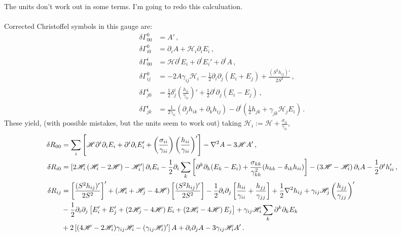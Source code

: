 \documentclass{article}
\newcommand*\scr[1]{\mathscr{#1}}
\newcommand*\p[1]{\left(#1\right)}
\newcommand*\ps[1]{\left[#1\right]}
\newcommand*\f[2]{\frac{#1}{#2}}
\begin{document}
The units don't work out in some terms. I'm going to redo this calculuation.
\\\\
Corrected Christoffel symbols in this gauge are:
\begin{align}
\delta\Gamma^0_{00}&=A'\,,\\
\delta\Gamma^0_{i0}&=\partial_i A+\scr H_i\partial_i E_i\,,\\
\delta\Gamma^i_{00}&=\scr H\partial^i E_i+\partial^i E_i'+\partial^i A\,,\\
\delta\Gamma^0_{ij}&=-2A\gamma_{ij}\scr H_i-\f12\partial_i\partial_j(E_i+E_j)+\f{(S^2 h_{ij})'}{2S^2}\,,\\
\delta\Gamma^i_{j0}&=\f12\delta^i_j\p{\f{h_{ii}}{\gamma_{ii}}}'+\f12\partial^i\partial_j(E_i-E_j)\,,\\
\delta\Gamma^i_{jk}&=\f1{2\gamma_{ii}}\p{\partial_j h_{ik}+\partial_k h_{ij}}-\partial^i\p{\f12h_{jk}+\gamma_{jk}\scr H_jE_i}\,.
\end{align}
These yield, (with possible mistakes, but the units seem to work out) taking $\scr H_i:=\scr H+\f{\sigma_{ii}}{\gamma_{ii}}$,
\begin{align}
\delta R_{00}&=\sum_i\ps{\scr H\partial^i\partial_iE_i+\partial^i\partial_iE_i'+\p{\f{\sigma_{ii}}{\gamma_{ii}}}\p{\f{h_{ii}}{\gamma_{ii}}}'}-\nabla^2 A-3\scr H A'\,,\\
\notag\delta R_{i0}&=\ps{2\scr H_i\p{\scr H_i-2\scr H}-\scr H_i'}\partial_i E_i-\f12\partial_i\sum_k\ps{\partial^k\partial_k(E_k-E_i)+\f{\sigma_{kk}}{\gamma_{kk}^2}(h_{kk}-\delta_{ik}h_{ii})}-\p{3\scr H-\scr H_i}\partial_i A-\f12\partial^ih_{ii}'\,,\\
\notag\delta R_{ij}&=\ps{\f{(S^2h_{ij})'}{2S^2}}'+\p{\scr H_i+\scr H_j-4\scr H}\ps{\f{(S^2h_{ij})'}{2S^2}}-\f12\partial_i\partial_j\ps{\f{h_{ii}}{\gamma_{ii}}+\f{h_{jj}}{\gamma_{jj}}}+\f12\nabla^2h_{ij}+\gamma_{ij}\scr H_j\p{\f{h_{jj}}{\gamma_{jj}}}'\\\notag&-\f12\partial_i\partial_j\ps{E_i'+E_j'+\p{2\scr H_j-4\scr H}E_i+\p{2\scr H_i-4\scr H}E_j}+\gamma_{ij}\scr H_i\sum_k\partial^k\partial_kE_k\\&+2\ps{(4\scr H-2\scr H_i)\gamma_{ij}\scr H_i-(\gamma_{ij}\scr H_i)'}A+\partial_i\partial_j A-3\gamma_{ij}\scr H_i A'\,.
\end{align}
\end{document}
